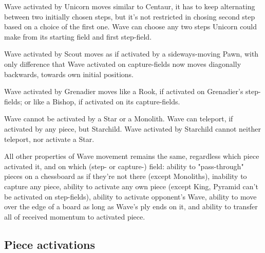Wave activated by Unicorn moves similar to Centaur, it has to keep alternating
between two initially chosen steps, but it's not restricted in chosing second step
based on a choice of the first one. Wave can choose any two steps Unicorn could
make from its starting field and first step-field.

Wave activated by Scout moves as if activated by a sideways-moving Pawn, with only
difference that Wave activated on capture-fields now moves diagonally backwards,
towards own initial positions.

Wave activated by Grenadier moves like a Rook, if activated on Grenadier's step-fields;
or like a Bishop, if activated on its capture-fields.

Wave cannot be activated by a Star or a Monolith. Wave can teleport, if activated
by any piece, but Starchild. Wave activated by Starchild cannot neither teleport,
nor activate a Star.

All other properties of Wave movement remains the same, regardless which piece
activated it, and on which (step- or capture-) field: ability to "pass-through"
pieces on a chessboard as if they're not there (except Monoliths), inability to
capture any piece, ability to activate any own piece (except King, Pyramid can't
be activated on step-fields), ability to activate opponent's Wave, ability to move
over the edge of a board as long as Wave's ply ends on it, and ability to transfer
all of received momentum to activated piece.

\clearpage %

\subsection*{Piece activations}
\label{sec:Appendix/Summary/Piece activations}


